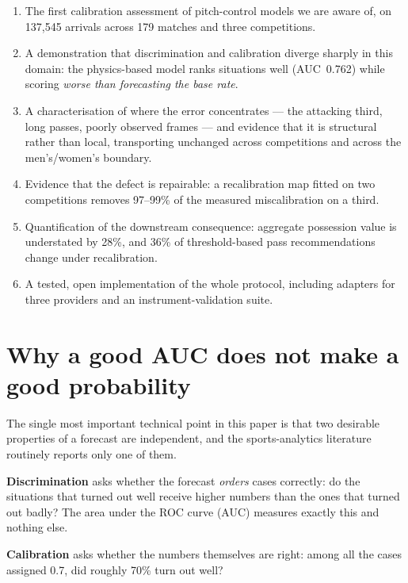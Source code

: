 \documentclass[11pt,a4paper]{article}
\begin{document}
\begin{enumerate}[leftmargin=1.4em, itemsep=0.25em]
  \item The first calibration assessment of pitch-control models we are aware of,
        on 137{,}545 arrivals across 179 matches and three competitions.
  \item A demonstration that discrimination and calibration diverge sharply in
        this domain: the physics-based model ranks situations well
        (AUC~0.762) while scoring \emph{worse than forecasting the base rate}.
  \item A characterisation of where the error concentrates --- the attacking
        third, long passes, poorly observed frames --- and evidence that it is
        structural rather than local, transporting unchanged across competitions
        and across the men's/women's boundary.
  \item Evidence that the defect is repairable: a recalibration map fitted on two
        competitions removes 97--99\% of the measured miscalibration on a third.
  \item Quantification of the downstream consequence: aggregate possession value
        is understated by 28\%, and 36\% of threshold-based pass recommendations
        change under recalibration.
  \item A tested, open implementation of the whole protocol, including adapters
        for three providers and an instrument-validation suite.
\end{enumerate}

\section{Why a good AUC does not make a good probability}
\label{sec:auc}

The single most important technical point in this paper is that two desirable
properties of a forecast are independent, and the sports-analytics literature
routinely reports only one of them.

\textbf{Discrimination} asks whether the forecast \emph{orders} cases correctly:
do the situations that turned out well receive higher numbers than the ones that
turned out badly? The area under the ROC curve (AUC) measures exactly this and
nothing else.

\textbf{Calibration} asks whether the numbers themselves are right: among all the
cases assigned 0.7, did roughly 70\% turn out well?
\end{document}
